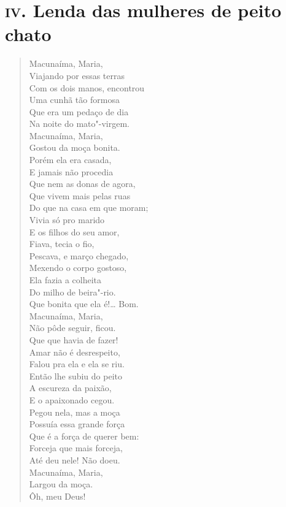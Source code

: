 \pagebreak
\section*{\textsc{iv}. Lenda das mulheres de peito chato}

\begin{verse}
Macunaíma, Maria,\\
Viajando por essas terras\\
Com os dois manos, encontrou\\
Uma cunhã tão formosa\\
Que era um pedaço de dia\\
Na noite do mato"-virgem.\\
Macunaíma, Maria,\\
Gostou da moça bonita.\\
Porém ela era casada,\\
E jamais não procedia\\
Que nem as donas de agora,\\
Que vivem mais pelas ruas\\
Do que na casa em que moram;\\
Vivia só pro marido\\
E os filhos do seu amor,\\
Fiava, tecia o fio,\\
Pescava, e março chegado,\\
Mexendo o corpo gostoso,\\
Ela fazia a colheita\\
Do milho de beira"-rio.\\
Que bonita que ela é!\ldots{} Bom.\\
Macunaíma, Maria,\\
Não pôde seguir, ficou.\\
Que que havia de fazer!\\
Amar não é desrespeito,\\
Falou pra ela e ela se riu.\\
Então lhe subiu do peito\\
A escureza da paixão,\\
E o apaixonado cegou.\\
Pegou nela, mas a moça\\
Possuía essa grande força\\
Que é a força de querer bem:\\
Forceja que mais forceja,\\
Até deu nele! Não doeu.\\
Macunaíma, Maria,\\
Largou da moça.\\
\quad\quad\quad{}Ôh, meu Deus!


\end{verse}
